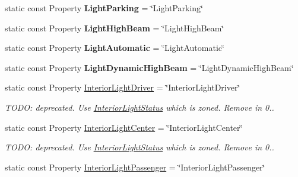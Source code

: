 \begin{DoxyCompactItemize}
\item 
\hypertarget{classVehicleProperty_a144920830af1df5a59433f98ebd29504}{static const Property {\bfseries Light\+Parking} = \char`\"{}Light\+Parking\char`\"{}}\label{classVehicleProperty_a144920830af1df5a59433f98ebd29504}

\item 
\hypertarget{classVehicleProperty_acce36f505d4b0233c753f0d5f568e255}{static const Property {\bfseries Light\+High\+Beam} = \char`\"{}Light\+High\+Beam\char`\"{}}\label{classVehicleProperty_acce36f505d4b0233c753f0d5f568e255}

\item 
\hypertarget{classVehicleProperty_a50b5b2d3b9a2f75d778735520b5c290d}{static const Property {\bfseries Light\+Automatic} = \char`\"{}Light\+Automatic\char`\"{}}\label{classVehicleProperty_a50b5b2d3b9a2f75d778735520b5c290d}

\item 
\hypertarget{classVehicleProperty_a0c94ca523d1feb5dcb53eb050006ecd0}{static const Property {\bfseries Light\+Dynamic\+High\+Beam} = \char`\"{}Light\+Dynamic\+High\+Beam\char`\"{}}\label{classVehicleProperty_a0c94ca523d1feb5dcb53eb050006ecd0}

\item 
\hypertarget{classVehicleProperty_a16b99ec2210fd4ca509a00e59b80f8c0}{static const Property \hyperlink{classVehicleProperty_a16b99ec2210fd4ca509a00e59b80f8c0}{Interior\+Light\+Driver} = \char`\"{}Interior\+Light\+Driver\char`\"{}}\label{classVehicleProperty_a16b99ec2210fd4ca509a00e59b80f8c0}

\begin{DoxyCompactList}\small\item\em T\+O\+D\+O\+: deprecated. Use \hyperlink{interfaceInteriorLightStatus}{Interior\+Light\+Status} which is zoned. Remove in 0.. \end{DoxyCompactList}\item 
\hypertarget{classVehicleProperty_a86c0bb4ab676e06e3c807d90c92e7240}{static const Property \hyperlink{classVehicleProperty_a86c0bb4ab676e06e3c807d90c92e7240}{Interior\+Light\+Center} = \char`\"{}Interior\+Light\+Center\char`\"{}}\label{classVehicleProperty_a86c0bb4ab676e06e3c807d90c92e7240}

\begin{DoxyCompactList}\small\item\em T\+O\+D\+O\+: deprecated. Use \hyperlink{interfaceInteriorLightStatus}{Interior\+Light\+Status} which is zoned. Remove in 0.. \end{DoxyCompactList}\item 
\hypertarget{classVehicleProperty_af60682429c3b2c7517715801d4ac0f92}{static const Property \hyperlink{classVehicleProperty_af60682429c3b2c7517715801d4ac0f92}{Interior\+Light\+Passenger} = \char`\"{}Interior\+Light\+Passenger\char`\"{}}\label{classVehicleProperty_af60682429c3b2c7517715801d4ac0f92}


\end{DoxyCompactItemize}
